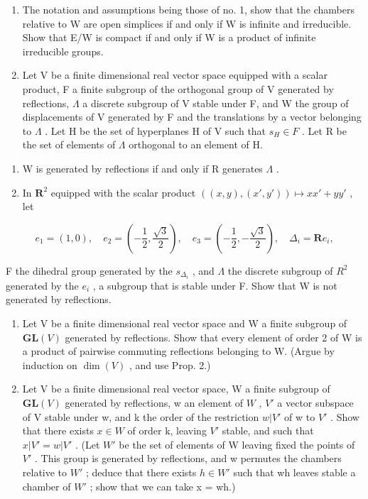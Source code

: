 
\begin{enumerate}
\def\labelenumi{\arabic{enumi})}
\item
  The notation and assumptions being those of no. 1, show that the chambers relative to W are open simplices if and only if W is infinite and irreducible. Show that E/W is compact if and only if W is a product of infinite irreducible groups.
\item
  Let V be a finite dimensional real vector space equipped with a scalar product, F a finite subgroup of the orthogonal group of V generated by reflections, \(\Lambda\) a discrete subgroup of V stable under F, and W the group of displacements of V generated by F and the translations by a vector belonging to \(\Lambda\) . Let H be the set of hyperplanes H of V such that \(s_{H} \in F\) . Let R be the set of elements of \(\Lambda\) orthogonal to an element of H.
\end{enumerate}

\begin{enumerate}
\def\labelenumi{\alph{enumi})}
\item
  W is generated by reflections if and only if R generates \(\Lambda\) .
\item
  In \(\mathbf{R}^2\) equipped with the scalar product \(((x,y),(x',y'))\mapsto xx' + yy'\) , let
\end{enumerate}

\[
e _ {1} = (1, 0), \quad e _ {2} = \left(- \frac {1}{2}, \frac {\sqrt {3}}{2}\right), \quad e _ {3} = \left(- \frac {1}{2}, - \frac {\sqrt {3}}{2}\right), \quad \Delta_ {i} = \mathbf {R} e _ {i},
\]

F the dihedral group generated by the \(s_{\Delta_{i}}\) , and \(\Lambda\) the discrete subgroup of \(R^{2}\) generated by the \(e_{i}\) , a subgroup that is stable under F. Show that W is not generated by reflections.

\begin{enumerate}
\def\labelenumi{\arabic{enumi})}
\setcounter{enumi}{2}
\item
  Let V be a finite dimensional real vector space and W a finite subgroup of \(\mathbf{GL}(V)\) generated by reflections. Show that every element of order 2 of W is a product of pairwise commuting reflections belonging to W. (Argue by induction on \(\dim(V)\) , and use Prop. 2.)
\item
  Let V be a finite dimensional real vector space, W a finite subgroup of \(\mathbf{GL}(V)\) generated by reflections, w an element of \(W\) , \(V'\) a vector subspace of V stable under w, and k the order of the restriction \(w|V'\) of w to \(V'\) . Show that there exists \(x \in W\) of order k, leaving \(V'\) stable, and such that \(x|V' = w|V'\) . (Let \(W'\) be the set of elements of W leaving fixed the points of \(V'\) . This group is generated by reflections, and w permutes the chambers relative to \(W'\) ; deduce that there exists \(h \in W'\) such that wh leaves stable a chamber of \(W'\) ; show that we can take x = wh.)
\end{enumerate}

